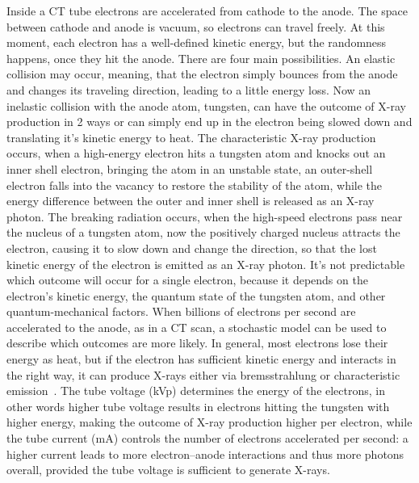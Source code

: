 \documentclass[12pt,a4paper]{article}
\begin{document}
Inside a CT tube electrons are accelerated from cathode to the anode. The space between cathode and anode is vacuum, so electrons can travel freely. At this moment, each electron has a well-defined kinetic energy, but the randomness happens, once they hit the anode. There are four main possibilities. An elastic collision may occur, meaning, that the electron simply bounces from the anode and changes its traveling direction, leading to a little energy loss. Now an inelastic collision with the anode atom, tungsten, can have the outcome of X-ray production in 2 ways or can simply end up in the electron being slowed down and translating it's kinetic energy to heat. The characteristic X-ray production occurs, when a high-energy electron hits a tungsten atom and knocks out an inner shell electron, bringing the atom in an unstable state, an outer-shell electron falls into the vacancy to restore the stability of the atom, while the energy difference between the outer and inner shell is released as an X-ray photon. The breaking radiation occurs, when the high-speed electrons pass near the nucleus of a tungsten atom, now the positively charged nucleus attracts the electron, causing it to slow down and change the direction, so that the lost kinetic energy of the electron is emitted as an X-ray photon. It’s not predictable which outcome will occur for a single electron, because it depends on the electron’s kinetic energy, the quantum state of the tungsten atom, and other quantum-mechanical factors. When billions of electrons per second are accelerated to the anode, as in a CT scan, a stochastic model can be used to describe which outcomes are more likely. In general, most electrons lose their energy as heat, but if the electron has sufficient kinetic energy and interacts in the right way, it can produce X-rays either via bremsstrahlung or characteristic emission~\cite{Bushberg2021Ch2}.
\newline\newline 
The tube voltage (kVp) determines the energy of the electrons, in other words higher tube voltage results in electrons hitting the tungsten with higher energy, making the outcome of X-ray production higher per electron, while the tube current (mA) controls the number of electrons accelerated per second: a higher current leads to more electron–anode interactions and thus more photons overall, provided the tube voltage is sufficient to generate X-rays. 
\newline\newline
\end{document}

